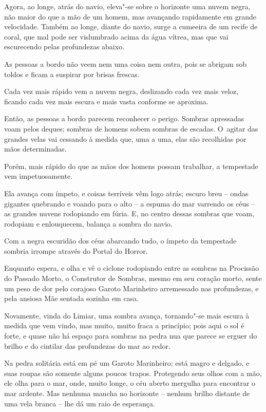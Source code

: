 Agora, ao longe, atrás do navio, eleva"-se sobre o horizonte uma nuvem
negra, não maior do que a mão de um homem, mas avançando rapidamente em
grande velocidade. Também ao longe, diante do navio, surge a cumeeira de
um recife de coral, que mal pode ser vislumbrado acima da água vítrea, mas que 
vai escurecendo pelas profundezas abaixo.

As pessoas a bordo não veem nem uma coisa nem outra, pois se abrigam sob
toldos e ficam a suspirar por brisas frescas.

Cada vez mais rápido vem a nuvem negra, deslizando cada vez mais veloz,
ficando cada vez mais escura e mais vasta conforme se aproxima.

Então, as pessoas a bordo parecem reconhecer o perigo. Sombras
apressadas voam pelos deques; sombras de homens sobem sombras de
escadas. O~agitar das grandes velas vai cessando à medida que, uma a
uma, elas são recolhidas por mãos determinadas.

Porém, mais rápido do que as mãos dos homens possam trabalhar, a tempestade
vem impetuosamente.

Ela avança com ímpeto, e coisas terríveis vêm logo atrás; escuro breu --
ondas gigantes quebrando e voando para o alto -- a espuma do mar
varrendo os céus -- as grandes nuvens rodopiando em fúria. E, no centro
dessas sombras que voam, rodopiam e enlouquecem, balança a sombra do
navio.

Com a negra escuridão dos céus abarcando tudo, o ímpeto da tempestade
sombria irrompe através do Portal do Horror.

Enquanto espera, e olha e vê o ciclone rodopiando entre as sombras na
Procissão do Passado Morto, o Construtor de Sombras, mesmo em seu
coração morto, sente um peso de dor pelo corajoso Garoto Marinheiro
arremessado nas profundezas, e pela ansiosa Mãe sentada sozinha em casa.

\smallskip
Novamente, vinda do Limiar, uma sombra avança, tornando"-se mais escura à
medida que vem vindo, mas muito, muito fraca a princípio; pois aqui o
sol é forte, e quase não há espaço para sombras na pedra nua que parece
se erguer do brilho e do cintilar das profundezas do mar ao redor.

Na pedra solitária está em pé um Garoto Marinheiro; está magro e
delgado, e suas roupas são somente alguns poucos trapos. Protegendo seus
olhos com a mão, ele olha para o mar, onde, muito longe, o céu aberto
mergulha para encontrar o mar ardente. Mas nenhuma mancha no horizonte
-- nenhum brilho distante de uma vela branca -- lhe dá um raio de
esperança.

